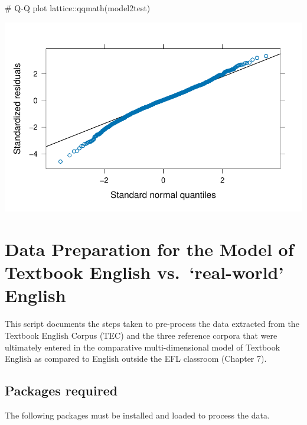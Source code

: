 \documentclass[
  letterpaper,
  DIV=11,
  numbers=noendperiod]{scrreprt}
\newenvironment{Shaded}{\begin{snugshade}}{\end{snugshade}}
\newcommand{\CommentTok}[1]{\textcolor[rgb]{0.37,0.37,0.37}{#1}}
\newcommand{\FunctionTok}[1]{\textcolor[rgb]{0.28,0.35,0.67}{#1}}
\newcommand{\NormalTok}[1]{\textcolor[rgb]{0.00,0.23,0.31}{#1}}
\newcommand{\SpecialCharTok}[1]{\textcolor[rgb]{0.37,0.37,0.37}{#1}}
\begin{document}
\begin{Shaded}
\begin{Highlighting}[]
\CommentTok{\# Q{-}Q plot}
\NormalTok{lattice}\SpecialCharTok{::}\FunctionTok{qqmath}\NormalTok{(model2test)}
\end{Highlighting}
\end{Shaded}

\includegraphics{AppendixF_files/figure-pdf/lmer-diagnostics-3.pdf}

\chapter{Data Preparation for the Model of Textbook English
vs.~`real-world'
English}\label{data-preparation-for-the-model-of-textbook-english-vs.-real-world-english}

This script documents the steps taken to pre-process the data extracted
from the Textbook English Corpus (TEC) and the three reference corpora
that were ultimately entered in the comparative multi-dimensional model
of Textbook English as compared to English outside the EFL classroom
(Chapter 7).

\section{Packages required}\label{packages-required-3}

The following packages must be installed and loaded to process the data.
\end{document}

